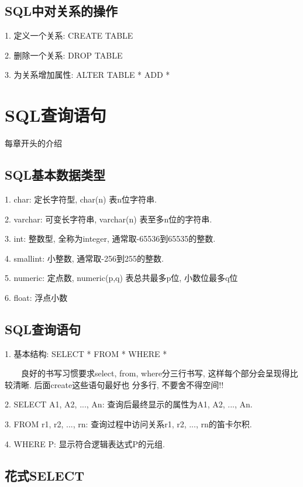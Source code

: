 \subsection{SQL中对关系的操作}

1. 定义一个关系: CREATE TABLE

2. 删除一个关系: DROP TABLE

3. 为关系增加属性: ALTER TABLE * ADD *

\section{SQL查询语句}

\begin{tcolorbox}[colback=red!5,colframe=red!75!black]
    每章开头的介绍
\end{tcolorbox}

\subsection{SQL基本数据类型}

1. char: 定长字符型, char(n) 表n位字符串.

2. varchar: 可变长字符串, varchar(n) 表至多n位的字符串.

3. int: 整数型, 全称为integer, 通常取-65536到65535的整数.

4. smallint: 小整数, 通常取-256到255的整数.

5. numeric: 定点数, numeric(p,q) 表总共最多p位, 小数位最多q位

6. float: 浮点小数

\subsection{SQL查询语句}

1. 基本结构: SELECT * FROM * WHERE *
\begin{tcolorbox}[colback=gray!5,colframe=orange!75!black,title=注意事项]
    ~~~~良好的书写习惯要求select, from, where分三行书写, 这样每个部分会呈现得比较清晰. 后面create这些语句最好也
    分多行, 不要舍不得空间!!
  \end{tcolorbox}

2. SELECT A1, A2, ..., An: 查询后最终显示的属性为A1, A2, ..., An.

3. FROM r1, r2, ..., rn: 查询过程中访问关系r1, r2, ..., rn的笛卡尔积.

4. WHERE P: 显示符合逻辑表达式P的元组.

\subsection{花式SELECT}

